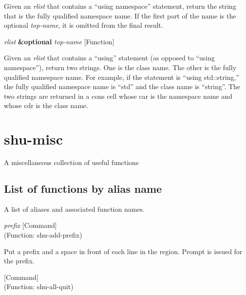 \begin{doc-string}
Given an \emph{rlist} that contains a ``using namespace'' statement, return the string
that is the fully qualified namespace name.  If the first part of the name is the
optional \emph{top-name}, it is omitted from the final result.
\end{doc-string}

\vspace{1em}
\noindent
{}
\usebox{\funcname}\emph{rlist} \textbf{\&optional} \emph{top-name}
 \hfill [Function]

\begin{doc-string}
Given an \emph{rlist} that contains a ``using'' statement (as opposed to ``using
namespace''), return two strings.  One is the class name.  The other is the
fully qualified namespace name.  For example, if the statement is ``using
std::string,'' the fully qualified namespace name is ``std'' and the class name
is ``string''.
The two strings are returned in a cons cell whose car is the namespace name and
whose cdr is the class name.
\end{doc-string}

\eject
\section{shu-misc}



A miscellaneous collection of useful functions


\subsection{List of functions by alias name}

A list of aliases and associated function names.



\vspace{1em}
\noindent
{}
\usebox{\funcname}\emph{prefix}
 \hfill [Command]\\%
 (Function: shu-add-prefix)

\begin{doc-string}
Put a prefix and a space in front of each line in the region.  Prompt is issued
for the prefix.
\end{doc-string}

\vspace{1em}
\noindent
{}
\usebox{\funcname}
 \hfill [Command]\\%
 (Function: shu-all-quit)

